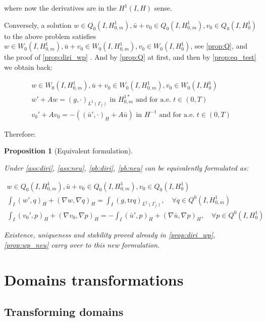 \documentclass[english,a4paper,9pt,oneside]{scrbook}	%
\theoremstyle{break}
\newtheorem{prop}[equation]{Proposition}
\theoremstyle{remark}
\newcommand{\tr}{\text{tr}}
\begin{document}
\begin{appendices}
where now the derivatives are in the $H^1(I,H)$ sense.

Conversely, a solution $w \in Q_0(I, H^1_{0,m}), \bar{u}+v_0 \in Q_0(I,H^1_{0,m}), v_0 \in Q_0(I,H^1_0) $ to the above problem satisfies $w \in W_0(I, H^1_{0,m}), \bar{u}+v_0 \in W_0(I,H^1_{0,m}), v_0 \in W_0(I,H^1_0)$, see \cref{prop:Q}, and the proof of \cref{prop:diri_wp} . And by \cref{prop:Q} at first, and then by \cref{prop:eq_test} we obtain back:

\begin{align*}
w \in W_0(I, H^1_{0,m}),\bar{u}+v_0 \in W_0(I,H^1_{0,m}), v_0 \in W_0(I,H^1_0)\\
w' + A w = (g,\cdot)_{L^2(\Gamma_f)} \text{ in }H^{1*}_{0,m} \text{ and for a.e. } t \in (0,T) \\
v_0' + A v_0 = -((\bar{u}',\cdot)_H+A \bar{u}) \text{ in }H^{-1} \text{ and for a.e. } t \in (0,T) 
\end{align*}

Therefore:

\begin{prop}[Equivalent formulation]
\label{prop:eq_form}

Under \cref{ass:diri}, \cref{ass:neu}, \cref{pb:diri}, \cref{pb:neu} can be equivalently formulated as:

\begin{align*}
w \in Q_0(I, H^1_{0,m}), \bar{u}+v_0 \in Q_0(I,H^1_{0,m}), v_0 \in Q_0(I,H^1_0) \\
\int_I ( w' , q)_H+ (\nabla w, \nabla q)_H = \int_I(g,\tr q)_{L^2(\Gamma_f)}, \quad \forall q \in Q^0(I, H^1_{0,m}) \\
\int_I (v_0',p)_H + (\nabla v_0, \nabla p)_H= -\int_I(\bar{u}',p)_H+(\nabla \bar{u}, \nabla p)_H, \quad \forall p \in Q^0(I, H^1_0) 
\end{align*}

Existence, uniqueness and stability proved already in  \cref{prop:diri_wp}, \cref{prop:wp_neu} carry over to this new formulation.

\end{prop}

\chapter{Domains transformations}
\label{chap:domain_transformations}
\section{Transforming domains}


\end{appendices}
\end{document}

